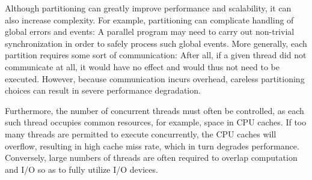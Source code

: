 Although partitioning can greatly improve performance and scalability,
it can also increase complexity.
For example, partitioning can complicate handling of global
errors and events: A parallel
program may need to carry out non-trivial synchronization in order
to safely process such global events.
More generally, each partition requires some sort of communication:
After all, if
a given thread did not communicate at all, it would have no effect and
would thus not need to be executed.
However, because communication incurs overhead, careless partitioning choices
can result in severe performance degradation.

Furthermore, the number of concurrent threads must often be controlled,
as each such thread occupies common resources, for example,
space in CPU caches.
If too many threads are permitted to execute concurrently, the
CPU caches will overflow, resulting in high cache miss rate, which in
turn degrades performance.
Conversely, large numbers of threads are often required to
overlap computation and I/O so as to fully utilize I/O devices.

\QuickQuizEnd

